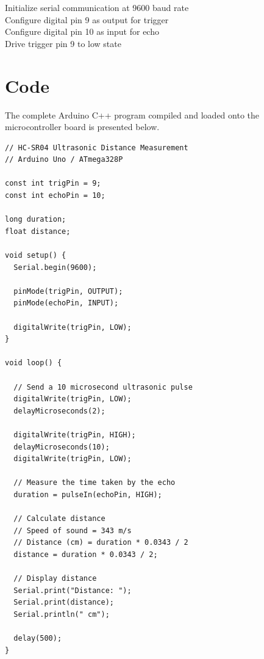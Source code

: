 \documentclass[11pt,a4paper]{article}
\begin{document}
\begin{algorithm}[H]
\DontPrintSemicolon
\caption{Distance measurement using ultrasonic sensor}
\label{algo_ultrasonic}
Initialize serial communication at 9600 baud rate \\
Configure digital pin 9 as output for trigger \\
Configure digital pin 10 as input for echo \\
Drive trigger pin 9 to low state \\
\BlankLine
{}
\end{algorithm}

\section{Code}
The complete Arduino C++ program compiled and loaded onto the microcontroller board is presented below.

\begin{lstlisting}
// HC-SR04 Ultrasonic Distance Measurement
// Arduino Uno / ATmega328P

const int trigPin = 9;
const int echoPin = 10;

long duration;
float distance;

void setup() {
  Serial.begin(9600);

  pinMode(trigPin, OUTPUT);
  pinMode(echoPin, INPUT);

  digitalWrite(trigPin, LOW);
}

void loop() {

  // Send a 10 microsecond ultrasonic pulse
  digitalWrite(trigPin, LOW);
  delayMicroseconds(2);

  digitalWrite(trigPin, HIGH);
  delayMicroseconds(10);
  digitalWrite(trigPin, LOW);

  // Measure the time taken by the echo
  duration = pulseIn(echoPin, HIGH);

  // Calculate distance
  // Speed of sound = 343 m/s
  // Distance (cm) = duration * 0.0343 / 2
  distance = duration * 0.0343 / 2;

  // Display distance
  Serial.print("Distance: ");
  Serial.print(distance);
  Serial.println(" cm");

  delay(500);
}
\end{lstlisting}
\end{document}
